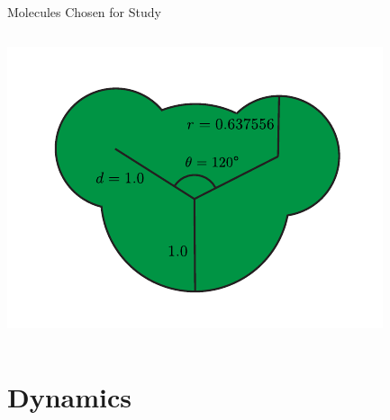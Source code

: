 \documentclass[16pt, aspectratio=43,compress]{beamer}
\begin{document}
\begin{frame}{Molecules Chosen for Study}
\begin{columns}
\begin{column}{0.3\linewidth}
            \centering
            \includegraphics[width=\textwidth]{tri}\\
            \tri
        \end{column}
    \end{columns}
\end{frame}

\section{Dynamics}
\end{document}
